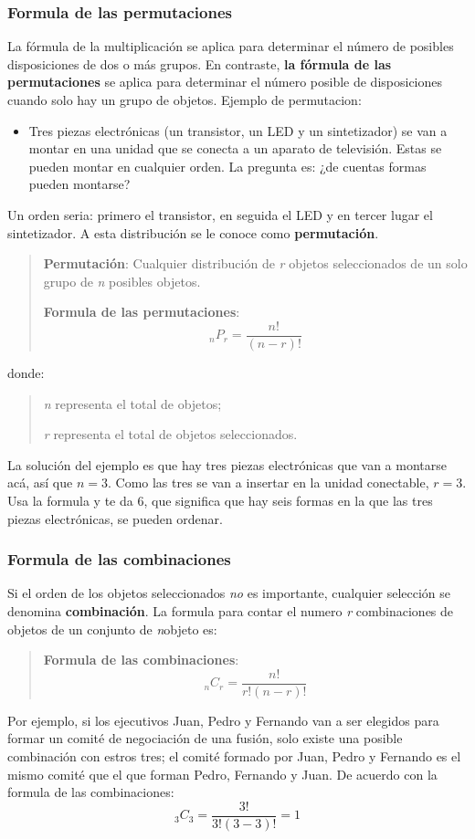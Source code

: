 \documentclass[]{article}
\begin{document}
\subsubsection*{Formula de las permutaciones}
La fórmula de la multiplicación se aplica para determinar el número de posibles disposiciones de dos o más grupos. En contraste, \textbf{la fórmula de las permutaciones} se aplica para determinar el número posible de disposiciones cuando solo hay un grupo de objetos. Ejemplo de permutacion:
\begin{itemize}
	\item Tres piezas electrónicas (un transistor, un LED y un sintetizador) se van a montar en una unidad que se conecta a un aparato de televisión. Estas se pueden montar en cualquier orden. La pregunta es: ¿de cuentas formas pueden montarse?
\end{itemize}
Un orden seria: primero el transistor, en seguida el LED y en tercer lugar el sintetizador. A esta distribución se le conoce como \textbf{permutación}.
\begin{quote}
	\textbf{Permutación}: Cualquier distribución de \textit{r} objetos seleccionados de un solo grupo de \textit{n} posibles objetos.
	\item \textbf{Formula de las permutaciones}: \[ _{n}P_{r} = \frac{n!}{(n - r)! }\]
\end{quote}
donde:
\begin{quote}
	\textit{n} representa el total de objetos;
	\item \textit{r} representa el total de objetos seleccionados.
\end{quote}
La solución del ejemplo es que hay tres piezas electrónicas que van a montarse acá, así que $n = 3$. Como las tres se van a insertar en la unidad conectable, $r = 3$. Usa la formula y te da 6, que significa que hay seis formas en la que las tres piezas electrónicas, se pueden ordenar. 
\subsubsection*{Formula de las combinaciones}
Si el orden de los objetos seleccionados \textit{no} es importante, cualquier selección se denomina \textbf{combinación}. La formula para contar el numero \textit{r} combinaciones de objetos de un conjunto de \textit{n}objeto es:
\begin{quote}
	\textbf{Formula de las combinaciones}:  \[ _{n}C_{r} = \frac{n!}{r! (n - r)! }\]
\end{quote}
Por ejemplo, si los ejecutivos Juan, Pedro y Fernando van a ser elegidos para formar un comité de negociación de una fusión, solo existe una posible combinación con estros tres; el comité formado por Juan, Pedro y Fernando es el mismo comité que el que forman Pedro, Fernando y Juan. De acuerdo con la formula de las combinaciones:
\[ _{3}C_{3} = \frac{3!}{3! (3 - 3)! } =  1\]
\end{document}
